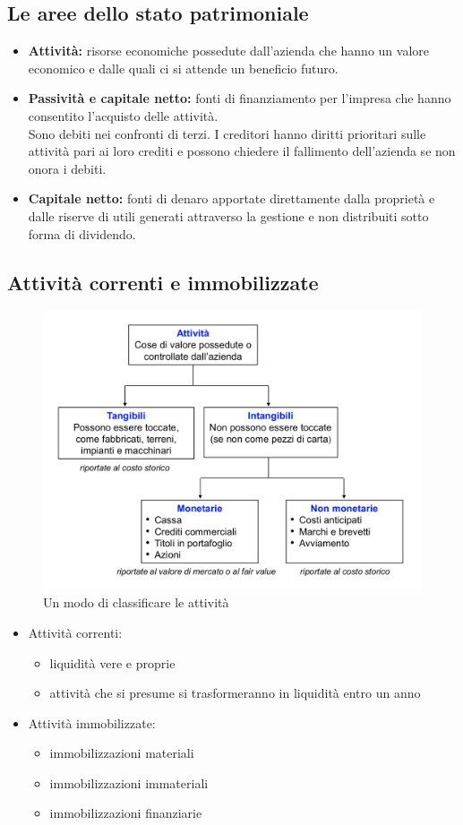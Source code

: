 \documentclass{report}
\newcommand\hr{\par\vspace{-.5\ht\strutbox}\noindent\hrulefill\par}
\begin{document}
	\subsection{Le aree dello stato patrimoniale}
	\begin{itemize}
		\item \textbf{Attività:} risorse economiche possedute dall'azienda che hanno un valore economico e dalle quali ci si attende un beneficio futuro.
		\hr
		\item \textbf{Passività e capitale netto:} fonti di finanziamento per l'impresa che hanno consentito l'acquisto delle attività.
		\medskip \\Sono debiti nei confronti di terzi. I creditori hanno diritti prioritari sulle attività pari ai loro crediti e possono chiedere il fallimento dell'azienda se non onora i debiti.
		\item \textbf{Capitale netto:} fonti di denaro apportate direttamente dalla proprietà e dalle riserve di utili generati attraverso la gestione e non distribuiti sotto forma di dividendo.
	\end{itemize}
	\subsection{Attività correnti e immobilizzate}
	\begin{figure}[h]
		\centering
		\caption{Un modo di classificare le attività}
		\label{fig:classificazione-attivita}
		\includegraphics[width=0.7\linewidth]{images/classificazione-attivita}
	\end{figure}
	\begin{itemize}
		\item Attività correnti:
		\begin{itemize}
			\item liquidità vere e proprie
			\item attività che si presume si trasformeranno in liquidità entro un anno \\
		\end{itemize}
		\item Attività immobilizzate:
		\begin{itemize}
			\item immobilizzazioni materiali
			\item immobilizzazioni immateriali
			\item immobilizzazioni finanziarie
		\end{itemize}
	\end{itemize}
\end{document}
